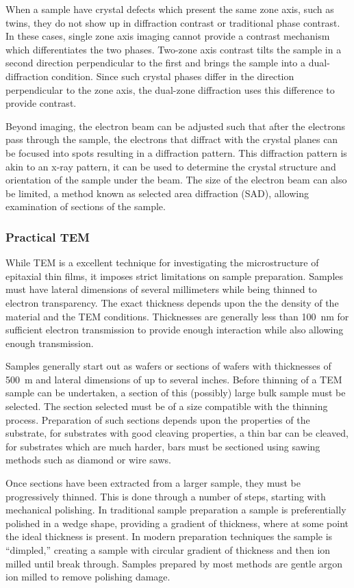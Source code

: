 When a sample have crystal defects which present the same zone axis, such as twins, they do not show up in diffraction contrast or traditional phase contrast. In these cases, single zone axis imaging cannot provide a contrast mechanism which differentiates the two phases. Two-zone axis contrast tilts the sample in a second direction perpendicular to the first and brings the sample into a dual-diffraction condition. Since such crystal phases differ in the direction perpendicular to the zone axis, the dual-zone diffraction uses this difference to provide contrast.

Beyond imaging, the electron beam can be adjusted such that after the electrons pass through the sample, the electrons that diffract with the crystal planes can be focused into spots resulting in a diffraction pattern. This diffraction pattern is akin to an x-ray pattern, it can be used to determine the crystal structure and orientation of the sample under the beam. The size of the electron beam can also be limited, a method known as selected area diffraction (SAD), allowing examination of sections of the sample.
\subsubsection{Practical TEM}
While TEM is a excellent technique for investigating the microstructure of epitaxial thin films, it imposes strict limitations on sample preparation. Samples must have lateral dimensions of several millimeters while being thinned to electron transparency. The exact thickness depends upon the the density of the material and the TEM conditions. Thicknesses are generally less than 100~nm for sufficient electron transmission to provide enough interaction while also allowing enough transmission.

Samples generally start out as wafers or sections of wafers with thicknesses of 500~\micro{}m and lateral dimensions of up to several inches. Before thinning of a TEM sample can be undertaken, a section of this (possibly) large bulk sample must be selected. The section selected must be of a size compatible with the thinning process. Preparation of such sections depends upon the properties of the substrate, for substrates with good cleaving properties, a thin bar can be cleaved, for substrates which are much harder, bars must be sectioned using sawing methods such as diamond or wire saws.

Once sections have been extracted from a larger sample, they must be progressively thinned. This is done through a number of steps, starting with mechanical polishing. In traditional sample preparation a sample is preferentially polished in a wedge shape, providing a gradient of thickness, where at some point the ideal thickness is present. In modern preparation techniques the sample is ``dimpled,'' creating a sample with circular gradient of thickness and then ion milled until break through. Samples prepared by most methods are gentle argon ion milled to remove polishing damage.


